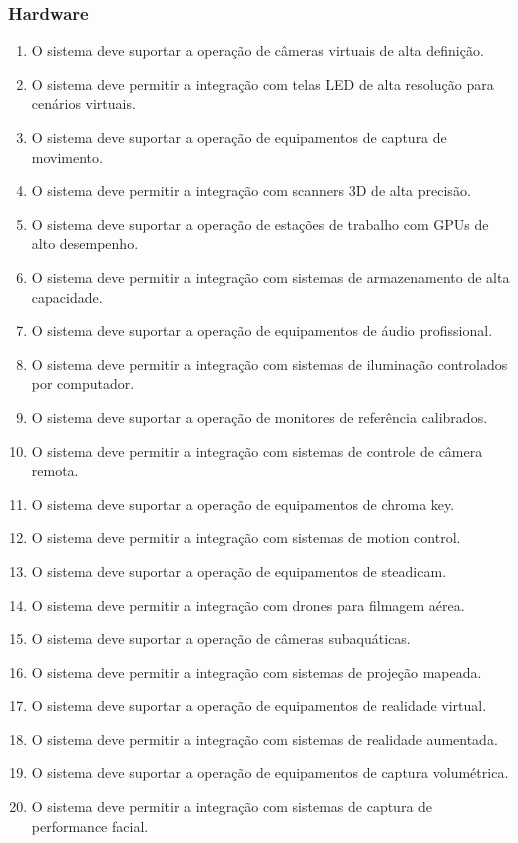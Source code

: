 \subsubsection{Hardware}
\begin{enumerate}
  \item O sistema deve suportar a operação de câmeras virtuais de alta definição.
  \item O sistema deve permitir a integração com telas LED de alta resolução para cenários virtuais.
  \item O sistema deve suportar a operação de equipamentos de captura de movimento.
  \item O sistema deve permitir a integração com scanners 3D de alta precisão.
  \item O sistema deve suportar a operação de estações de trabalho com GPUs de alto desempenho.
  \item O sistema deve permitir a integração com sistemas de armazenamento de alta capacidade.
  \item O sistema deve suportar a operação de equipamentos de áudio profissional.
  \item O sistema deve permitir a integração com sistemas de iluminação controlados por computador.
  \item O sistema deve suportar a operação de monitores de referência calibrados.
  \item O sistema deve permitir a integração com sistemas de controle de câmera remota.
  \item O sistema deve suportar a operação de equipamentos de chroma key.
  \item O sistema deve permitir a integração com sistemas de motion control.
  \item O sistema deve suportar a operação de equipamentos de steadicam.
  \item O sistema deve permitir a integração com drones para filmagem aérea.
  \item O sistema deve suportar a operação de câmeras subaquáticas.
  \item O sistema deve permitir a integração com sistemas de projeção mapeada.
  \item O sistema deve suportar a operação de equipamentos de realidade virtual.
  \item O sistema deve permitir a integração com sistemas de realidade aumentada.
  \item O sistema deve suportar a operação de equipamentos de captura volumétrica.
  \item O sistema deve permitir a integração com sistemas de captura de performance facial.
\end{enumerate}

